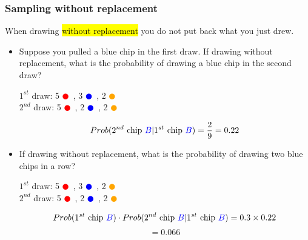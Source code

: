 \documentclass[notes,11pt, aspectratio=169]{beamer}
\begin{document}
\begin{frame}
\frametitle{Sampling without replacement}

When drawing \hl{without replacement} you do not put back what you just drew.

\begin{itemize}

\pause

\item Suppose you pulled a blue chip in the first draw. If drawing without replacement, what is the probability of drawing a blue chip in the second draw?
\pause
\begin{center}
$1^{st}$ draw: 5 \textcolor{red}{$\CIRCLE$}~, 3 \textcolor{blue}{$\CIRCLE$}~, 2 \textcolor{orange}{$\CIRCLE$} \\
\pause
$2^{nd}$ draw: 5 \textcolor{red}{$\CIRCLE$}~, 2 \textcolor{blue}{$\CIRCLE$}~, 2 \textcolor{orange}{$\CIRCLE$}
\end{center}
\pause
\[ Prob(2^{nd} \text{ chip } \textcolor{blue}{B} | 1^{st} \text{ chip } \textcolor{blue}{B}) = \frac{2}{9} = 0.22 \]

\pause

\item If drawing without replacement, what is the probability of drawing two blue chips in a row?
\begin{center}

\pause
$1^{st}$ draw: 5 \textcolor{red}{$\CIRCLE$}~, 3 \textcolor{blue}{$\CIRCLE$}~, 2 \textcolor{orange}{$\CIRCLE$} \\
$2^{nd}$ draw: 5 \textcolor{red}{$\CIRCLE$}~, 2 \textcolor{blue}{$\CIRCLE$}~, 2 \textcolor{orange}{$\CIRCLE$}
\end{center}
\pause
\[ Prob(1^{st} \text{ chip } \textcolor{blue}{B}) \cdot Prob(2^{nd} \text{ chip } \textcolor{blue}{B} | 1^{st} \text{ chip } \textcolor{blue}{B})  = 0.3 \times 0.22 \]
\[ = 0.066 \]

\end{itemize}

\end{frame}

\end{document}
